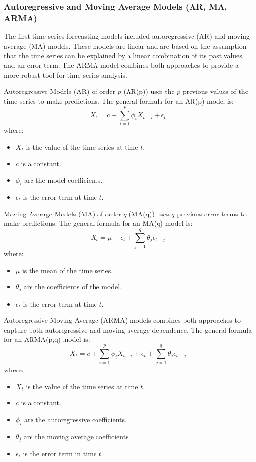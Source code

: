 \subsubsection{Autoregressive and Moving Average Models (AR, MA, ARMA)}

The first time series forecasting models included autoregressive (AR) and moving average (MA) models. These models are linear and are based on the assumption that the time series can be explained by a linear combination of its past values and an error term. The ARMA model combines both approaches to provide a more robust tool for time series analysis.

Autoregressive Models (AR) of order \( p \) (AR(p)) uses the \( p \) previous values of the time series to make predictions. The general formula for an AR(p) model is:
\[
X_t = c + \sum_{i=1}^{p} \phi_i X_{t-i} + \epsilon_t
\]
where:
\begin{itemize}
    \item \( X_t \) is the value of the time series at time \( t \).
    \item \( c \) is a constant.
    \item \( \phi_i \) are the model coefficients.
    \item \( \epsilon_t \) is the error term at time \( t \).
\end{itemize}

Moving Average Models (MA) of order \( q \) (MA(q)) uses \( q \) previous error terms to make predictions. The general formula for an MA(q) model is:
\[
X_t = \mu + \epsilon_t + \sum_{j=1}^{q} \theta_j \epsilon_{t-j}
\]
where:
\begin{itemize}
    \item \( \mu \) is the mean of the time series.
    \item \( \theta_j \) are the coefficients of the model.
    \item \( \epsilon_t \) is the error term at time \( t \).
\end{itemize}

Autoregressive Moving Average (ARMA) models combines both approaches to capture both autoregressive and moving average dependence. The general formula for an ARMA(p,q) model is:
\[
X_t = c + \sum_{i=1}^{p} \phi_i X_{t-i} + \epsilon_t + \sum_{j=1}^{q} \theta_j \epsilon_{t-j}
\]
where:
\begin{itemize}
    \item \( X_t \) is the value of the time series at time \( t \).
    \item \( c \) is a constant.
    \item \( \phi_i \) are the autoregressive coefficients.
    \item \( \theta_j \) are the moving average coefficients.
    \item \( \epsilon_t \) is the error term in time \( t \).
\end{itemize}

